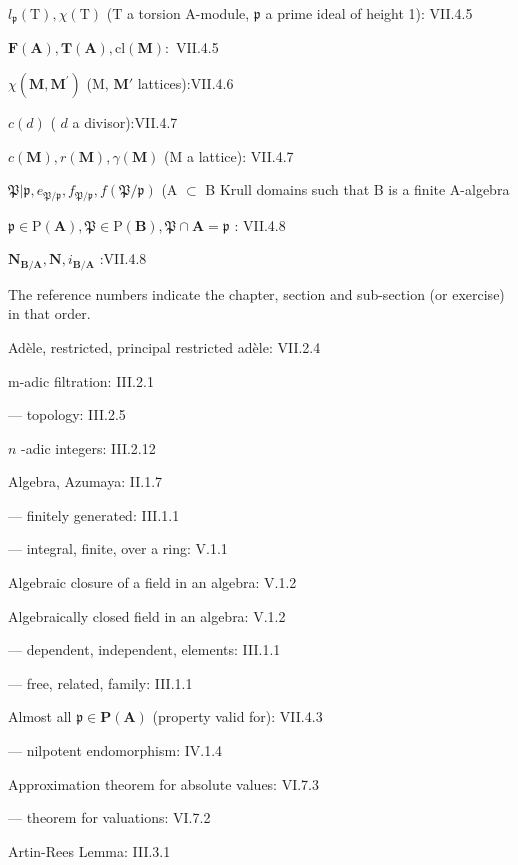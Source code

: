 \(l_{\mathfrak{p}}(\mathrm{T}), \chi (\mathrm{T})\) (T a torsion A-module, \(\mathfrak{p}\) a prime ideal of height 1): VII.4.5

\(\pmb {F}(\mathbf{A}),\pmb{T}(\mathbf{A}),\mathrm{cl}(\mathbf{M}):\) VII.4.5

\(\chi (\mathbf{M},\mathbf{M}^{\prime})\) (M, \(\mathbf{M}'\) lattices):VII.4.6

\(c(d)\) ( \(d\) a divisor):VII.4.7

\(c(\mathbf{M}), r(\mathbf{M}), \gamma(\mathbf{M})\) (M a lattice): VII.4.7

\(\mathfrak{P}|\mathfrak{p},e_{\mathfrak{P} / \mathfrak{p}},f_{\mathfrak{P} / \mathfrak{p}},f(\mathfrak{P} / \mathfrak{p})\) (A \(\subset\) B Krull domains such that B is a finite A-algebra

\(\mathfrak{p} \in \mathrm{P}(\mathbf{A}), \mathfrak{P} \in \mathrm{P}(\mathbf{B}), \mathfrak{P} \cap \mathbf{A} = \mathfrak{p}\) : VII.4.8

\(\mathbf{N}_{\mathbf{B} / \mathbf{A}},\mathbf{N},i_{\mathbf{B} / \mathbf{A}}\) :VII.4.8


The reference numbers indicate the chapter, section and sub-section (or exercise) in that order.

Adèle, restricted, principal restricted adèle: VII.2.4

m-adic filtration: III.2.1

--- topology: III.2.5

\(n\) -adic integers: III.2.12

Algebra, Azumaya: II.1.7

--- finitely generated: III.1.1

--- integral, finite, over a ring: V.1.1

Algebraic closure of a field in an algebra: V.1.2

Algebraically closed field in an algebra: V.1.2

--- dependent, independent, elements: III.1.1

--- free, related, family: III.1.1

Almost all \(\mathfrak{p} \in \mathbf{P}(\mathbf{A})\) (property valid for): VII.4.3

--- nilpotent endomorphism: IV.1.4

Approximation theorem for absolute values: VI.7.3

--- theorem for valuations: VI.7.2

Artin-Rees Lemma: III.3.1

